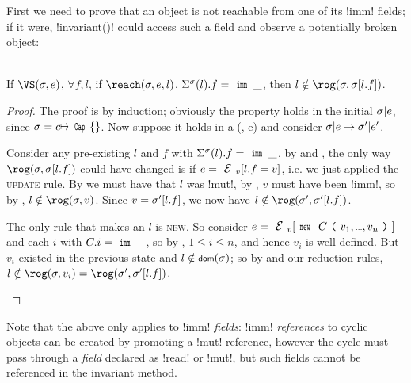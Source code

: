 First we need to prove that an object is not reachable from one of its \Q!imm! fields; if it were, \Q!invariant()! could access such a field and observe a potentially broken object:\SS
\begin{Lemma}\rm\ \\
\indent If $\VS(\s, e)$, $\forall f,l$, if $\reach(\s, e, l)$, $\Ss(l).f = \Kw{imm}\,\_$, then $l \notin \rog(\s, \s[l.f])$.
\end{Lemma}\SS
\begin{proof}
The proof is by induction; obviously the property holds in the initial $\sigma|e$, since $\s = c\mapsto \Kw{Cap}\{\}$. Now suppose it holds in a \VS(\s, e) and consider $\sigma|e \rightarrow \sigma'|e'$.
\begin{ienumerate}
	\item Consider any pre-existing \reach $l$ and $f$ with $\Ss(l).f = \Kw{imm}\,\_$, by  and , the only way $\rog(\s, \s[l.f])$ could have changed is if $e = \EV[l.f = v]$, i.e. we just applied the \textsc{update} rule. By  we must have that $l$ was \Q!mut!, by , $v$ must have been \Q!imm!, so by , $l \notin \rog(\s, v)$. Since $v = \sigma'[l.f]$, we now have $l \notin \rog(\s', \s'[l.f])$.
	\item The only rule that makes an $l$ \reach is \textsc{new}. So consider $e =\EV[\Kw{new}\ C\oR v_1,\ldots,v_n\cR]$ and each $i$ with $C.i = \Kw{imm}\,\_$, so by , $1 \leq i \leq n$, and hence $v_i$ is well-defined. But $v_i$ existed in the previous state and $l \notin \dom(\s)$; so by \VS and our reduction rules, $l \notin \rog(\s, v_i) = \rog(\s', \s'[l.f])$.
\end{ienumerate}
\end{proof}

Note that the above only applies to \Q!imm! \emph{fields}: \Q!imm! \emph{references} to cyclic objects can be created by promoting a \Q!mut! reference, however the cycle must pass through a \emph{field} declared as \Q!read! or \Q!mut!, but such fields cannot be referenced in the invariant method.


